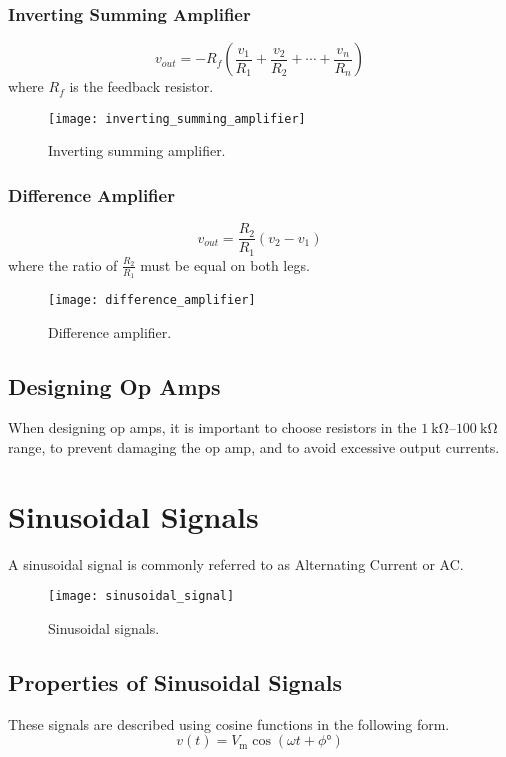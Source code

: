 \documentclass{article}
\begin{document}
\subsubsection{Inverting Summing Amplifier}
\begin{equation*}
    v_{out} = -R_f \left( \frac{v_1}{R_1} + \frac{v_2}{R_2} + \cdots + \frac{v_n}{R_n} \right)
\end{equation*}
where $R_f$ is the feedback resistor.
\begin{figure}[H]
    \centering
    \texttt{[image: inverting\_summing\_amplifier]}
    \caption{Inverting summing amplifier.}
\end{figure}
\subsubsection{Difference Amplifier}
\begin{equation*}
    v_{out} = \frac{R_2}{R_1} \left( v_2 - v_1 \right)
\end{equation*}
where the ratio of $\displaystyle \frac{R_2}{R_1}$ must be equal on both legs.
\begin{figure}[H]
    \centering
    \texttt{[image: difference\_amplifier]}
    \caption{Difference amplifier.}
\end{figure}
\subsection{Designing Op Amps}
When designing op amps, it is important to choose resistors in the $\qtyrange{1}{100}{\kilo\ohm}$
range, to prevent damaging the op amp, and to avoid excessive output currents.
\newpage
\section{Sinusoidal Signals}
\begin{definition}
    A sinusoidal signal is commonly referred to as Alternating Current or AC\@.
\end{definition}
\begin{figure}[H]
    \centering
    \texttt{[image: sinusoidal\_signal]}
    \caption{Sinusoidal signals.}
\end{figure}
\subsection{Properties of Sinusoidal Signals}
These signals are described using cosine functions in the following form.
\begin{equation*}
    v(t) = V_{\mathrm{m}} \cos{\left( \omega t + \phi\si{\degree} \right)}
\end{equation*}
\end{document}
